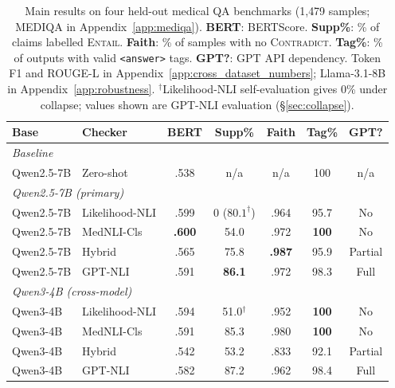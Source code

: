 \documentclass[11pt]{article}
\begin{document}
\begin{table}[t]
\centering\small
\setlength{\tabcolsep}{6pt}
\begin{tabular}{@{}ll ccccc@{}}
\toprule
\textbf{Base} & \textbf{Checker}
  & \textbf{BERT} & \textbf{Supp\%}
  & \textbf{Faith} & \textbf{Tag\%} & \textbf{GPT?} \\
\midrule
\multicolumn{7}{l}{\textit{Baseline}} \\
Qwen2.5-7B & Zero-shot & .538 & n/a & n/a & 100 & n/a \\
\midrule
\multicolumn{7}{l}{\textit{Qwen2.5-7B (primary)}} \\
Qwen2.5-7B & Likelihood-NLI & .599 & 0 ($80.1^{\dagger}$) & .964 & 95.7 & No \\
Qwen2.5-7B & MedNLI-Cls     & \textbf{.600} & 54.0 & .972 & \textbf{100} & No \\
Qwen2.5-7B & Hybrid         & .565 & 75.8 & \textbf{.987} & 95.9 & Partial \\
Qwen2.5-7B & GPT-NLI        & .591 & \textbf{86.1} & .972 & 98.3 & Full \\
\midrule
\multicolumn{7}{l}{\textit{Qwen3-4B (cross-model)}} \\
Qwen3-4B & Likelihood-NLI & .594 & 51.0$^{\dagger}$ & .952 & \textbf{100} & No \\
Qwen3-4B & MedNLI-Cls     & .591 & 85.3 & .980 & \textbf{100} & No \\
Qwen3-4B & Hybrid         & .542 & 53.2 & .833 & 92.1 & Partial \\
Qwen3-4B & GPT-NLI        & .582 & 87.2 & .962 & 98.4 & Full \\
\bottomrule
\end{tabular}
\caption{Main results on four held-out medical QA 
benchmarks (1{,}479 samples; MEDIQA in 
Appendix~\ref{app:mediqa}). 
\textbf{BERT}: BERTScore. 
\textbf{Supp\%}: \% of claims labelled \textsc{Entail}. 
\textbf{Faith}: \% of samples with no 
\textsc{Contradict}. 
\textbf{Tag\%}: \% of outputs with valid 
\texttt{<answer>} tags. 
\textbf{GPT?}: GPT API dependency. Token F1 and 
ROUGE-L in Appendix~\ref{app:cross_dataset_numbers}; 
Llama-3.1-8B in Appendix~\ref{app:robustness}.
$^{\dagger}$Likelihood-NLI self-evaluation gives 0\% 
under collapse; values shown are GPT-NLI evaluation 
(\S\ref{sec:collapse}).}
\label{tab:main}
\end{table}
\end{document}
